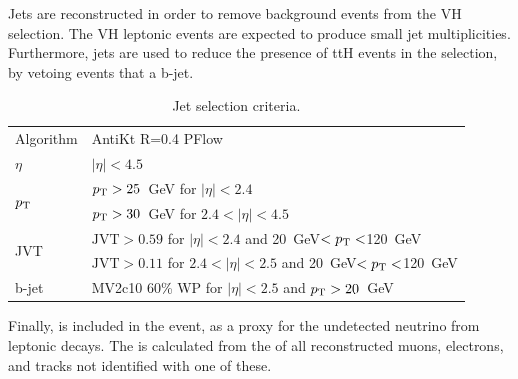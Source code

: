 Jets are reconstructed in order to remove background events from the VH selection.
The VH leptonic events are expected to produce small jet multiplicities.
Furthermore, jets are used to reduce the presence of ttH events in the selection, by vetoing events that a b-jet.

\begin{table}[H]
    \begin{center}
    \begin{tabular}{ll}
        \toprule
        Algorithm        &AntiKt R=0.4 PFlow\\
        $\eta$            &$|\eta| < 4.5$    \\
        \multirow{2}{*}{$p_\text{T}$}            &$p_\text{T} > 25$~GeV for $|\eta| < 2.4$\\
        &$p_\text{T} > 30$~GeV for $2.4 < |\eta| < 4.5$ \\
        \multirow{2}{*}{JVT}                & $\mathrm{JVT} > 0.59$ for $|\eta| < 2.4$ and 20~GeV$ < p_\text{T} < $120~GeV\\
        & $\mathrm{JVT} > 0.11$ for $2.4 < |\eta| < 2.5$ and 20~GeV$ < p_\text{T} < $120~GeV\\
        b-jet                & MV2c10 60\% WP for $|\eta| < 2.5$ and $p_\text{T} > 20$~GeV\\
        \bottomrule
    \end{tabular}
    \caption{Jet selection criteria.}
    \label{tab:hmmJetObjSel}
    \end{center}
\end{table}

Finally, \met is included in the event, as a proxy for the undetected neutrino from leptonic \W decays.
The \met is calculated from the \pt of all reconstructed muons, electrons, and tracks not identified with one of these.

